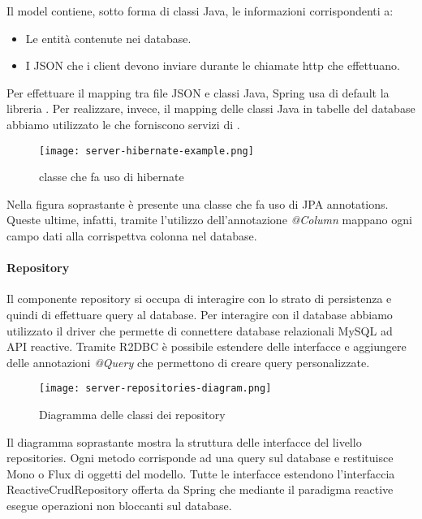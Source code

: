 \documentclass[../../manuale-manutentore.tex]{subfiles}
\begin{document}
Il model contiene, sotto forma di classi Java, le informazioni corrispondenti a:
\begin{itemize}
  \item Le entità contenute nei database.
  \item I JSON che i client devono inviare durante le chiamate http che effettuano.
\end{itemize}
Per effettuare il mapping tra file JSON e classi Java, Spring usa di default la libreria .
Per realizzare, invece, il mapping delle classi Java in tabelle del database abbiamo utilizzato le  che forniscono servizi di .

\begin{figure}[H]
  \centering
  \texttt{[image: server-hibernate-example.png]}
  \caption{classe che fa uso di hibernate}%
   \label{fig:classe che fa uso di hibernate}
\end{figure}

Nella figura soprastante è presente una classe che fa uso di JPA annotations.
Queste ultime, infatti, tramite l'utilizzo dell'annotazione \textit{@Column} mappano ogni campo dati alla corrispettva colonna nel database.


\paragraph{Repository}%
\label{par:repository}

Il componente repository si occupa di interagire con lo strato di persistenza e quindi di effettuare query al database.
Per interagire con il database abbiamo utilizzato il driver  che permette di connettere database relazionali MySQL ad API reactive.
Tramite R2DBC è possibile estendere delle interfacce e aggiungere delle annotazioni \textit{@Query} che permettono di creare query personalizzate.

\begin{figure}[H]
  \centering
  \texttt{[image: server-repositories-diagram.png]}
  \caption{Diagramma delle classi dei repository}%
   \label{fig:diagramma delle classi dei repository}
\end{figure}

Il diagramma soprastante mostra la struttura delle interfacce del livello repositories.
Ogni metodo corrisponde ad una query sul database e restituisce Mono o Flux di oggetti del modello.
Tutte le interfacce estendono l'interfaccia ReactiveCrudRepository offerta da Spring che mediante il paradigma reactive esegue operazioni non bloccanti sul database.
\end{document}
